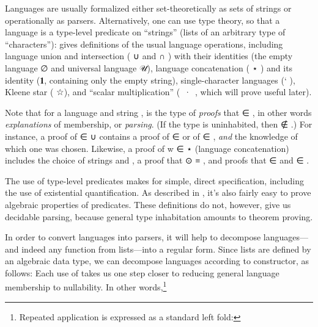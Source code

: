 \documentclass[acmsmall,screen]{acmart}
\begin{document}
Languages are usually formalized either set-theoretically as sets of strings or operationally as parsers.
Alternatively, one can use type theory, so that a language is a type-level predicate on ``strings'' (lists of an arbitrary type  of ``characters''):
 gives definitions of the usual language operations, including language union and intersection ({ \AF ∪ } and { \AF ∩ }) with their identities (the empty language \AF ∅ and universal language \AF 𝒰), language concatenation ({ \AF ⋆ }) and its identity (\AF 𝟏, containing only the empty string), single-character languages ({\AF ` }), Kleene star ({ \AF ☆}), and ``scalar multiplication'' (\mbox{ \AF · }, which will prove useful later).

Note that for a language  and string , { } is the type of \emph{proofs} that { ∈ }, in other words \emph{explanations} of membership, or \emph{parsing}.
(If the type { } is uninhabited, then { ∉ }.)
For instance, a proof of { ∈  \AF ∪ } contains a proof of { ∈ } or of { \AF ∈ }, \emph{and} the knowledge of which one was chosen.
Likewise, a proof of {w ∈  \AF ⋆ } (language concatenation) includes the choice of strings  and , a proof that { \AF ⊙  \AD ≡ }, and proofs that { ∈ } and { ∈ }.

The use of type-level predicates makes for simple, direct specification, including the use of existential quantification.
As described in , it's also fairly easy to prove algebraic properties of predicates.
These definitions do not, however, give us decidable parsing, because general type inhabitation amounts to theorem proving.


\rnc{}

In order to convert languages into parsers, it will help to decompose languages---and indeed any function from lists---into a regular form.
Since lists are defined by an algebraic data type, we can decompose languages according to constructor, as follows:
Each use of  takes us one step closer to reducing general language membership to nullability.
In other words,\footnote{Repeated application is expressed as a standard left fold:
}%
\end{document}
